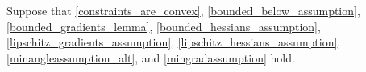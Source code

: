 Suppose that \cref{constraints_are_convex}, \cref{bounded_below_assumption}, \cref{bounded_gradients_lemma}, \cref{bounded_hessians_assumption}, \cref{lipschitz_gradients_assumption}, \cref{lipschitz_hessians_assumption}, \cref{minangleassumption_alt}, and \cref{mingradassumption} hold.
